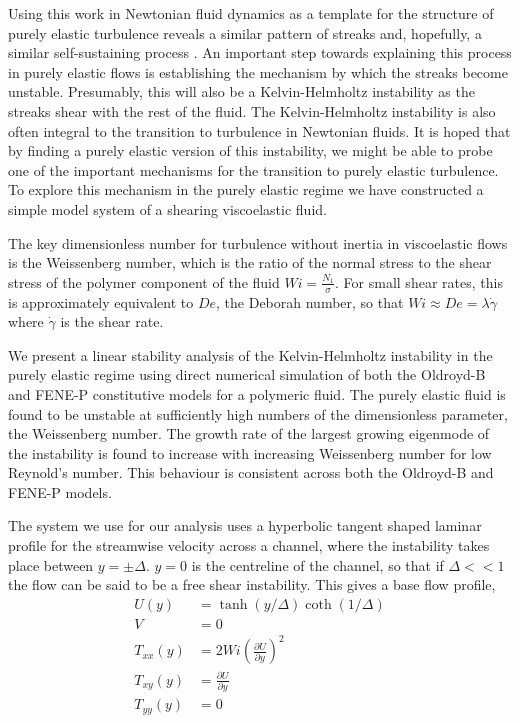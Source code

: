 \documentclass{jfm}
\newcommand{\dy}[1]{\frac{\partial #1}{\partial y}}
\begin{document}
Using this work in Newtonian fluid dynamics as a template for the structure of
purely elastic turbulence reveals a similar pattern of streaks and, hopefully,
a similar self-sustaining process \cite{US!}. An important step towards
explaining this process in purely elastic flows is establishing the mechanism
by which the streaks become unstable. Presumably, this will also be a
Kelvin-Helmholtz instability as the streaks shear with the rest of the fluid.
The Kelvin-Helmholtz instability is also often integral to the transition to
turbulence in Newtonian fluids. It is hoped that by finding a purely elastic
version of this instability, we might be able to probe one of the important
mechanisms for the transition to purely elastic turbulence. To explore this
mechanism in the purely elastic regime we have constructed a simple model
system of a shearing viscoelastic fluid.

The key dimensionless number for turbulence without inertia in viscoelastic
flows is the Weissenberg number, which is the ratio of the normal stress to the
shear stress of the polymer component of the fluid $Wi = \frac{N_{1}}{\sigma}$.
For small shear rates, this is approximately equivalent to $De$, the Deborah
number, so that $Wi \approx De = \lambda \dot{\gamma}$ where $\dot{\gamma}$ is
the shear rate.

We present a linear stability analysis of the Kelvin-Helmholtz instability in
the purely elastic regime using direct numerical simulation of both the
Oldroyd-B and FENE-P constitutive models for a polymeric fluid. The purely
elastic fluid is found to be unstable at sufficiently high numbers of the
dimensionless parameter, the Weissenberg number. The growth rate of the largest
growing eigenmode of the instability is found to increase with increasing
Weissenberg number for low Reynold's number. This behaviour is consistent
across both the Oldroyd-B and FENE-P models.

The system we use for our analysis uses a hyperbolic tangent shaped laminar
profile for the streamwise velocity across a channel, where the instability
takes place between $y = \pm \Delta$. $y=0$ is the centreline of the channel,
so that if $\Delta << 1$ the flow can be said to be a free shear instability.
This gives a base flow profile, 
\begin{align}
    U(y) &= \tanh \left( y/\Delta \right) \coth \left( 1/\Delta \right) \nonumber\\
    V &= 0 \nonumber \\
    T_{xx}(y) &= 2 Wi \left( \dy{U} \right)^{2} \nonumber \\
    T_{xy}(y) &= \dy{U} \nonumber \\
    T_{yy}(y) &= 0 \nonumber 
    \label{eq:KH_laminar_profile}
\end{align}
\end{document}
